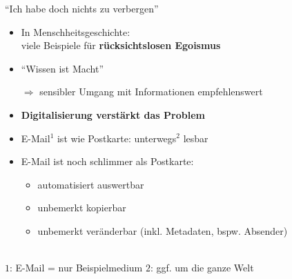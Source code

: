 \documentclass{beamer}
\begin{document}

\begin{frame}{"`Ich habe doch nichts zu verbergen"'}

  \begin{itemize}
   \item  In Menschheitsgeschichte:\\
   viele Beispiele für \textbf{rücksichtslosen Egoismus}
   \item "`Wissen ist Macht"'
   \item[$\Rightarrow$] sensibler Umgang mit Informationen empfehlenswert\\[5mm]

   \pause

   \item \textbf{Digitalisierung verstärkt das Problem}
   \item E-Mail${}^{1}$ ist wie Postkarte: unterwegs${}^{2}$ lesbar
   \item E-Mail ist noch schlimmer als Postkarte:
   \begin{itemize}
    \item automatisiert auswertbar
    \item unbemerkt kopierbar
    \item unbemerkt veränderbar (inkl. Metadaten, bspw. Absender)
   \end{itemize}
  \end{itemize}

  ~\\[5mm]
  {\tiny $1$: E-Mail = nur Beispielmedium \qquad $2$: ggf. um die ganze Welt }

\end{frame}

\end{document}
